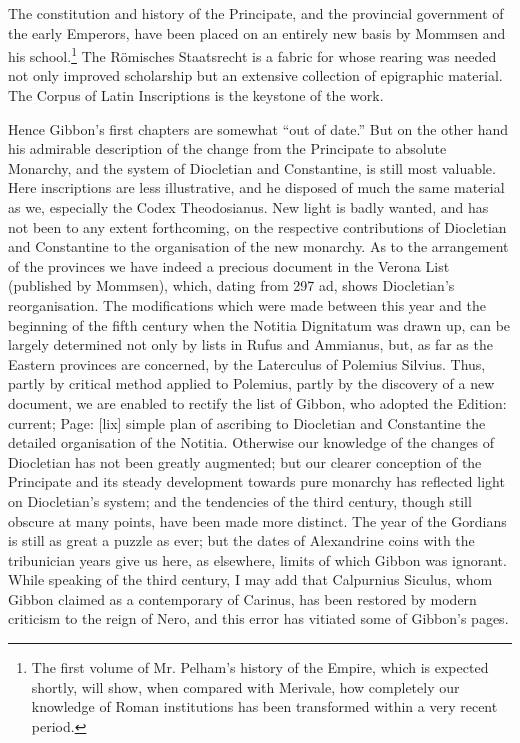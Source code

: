 The constitution and history of the Principate, and the provincial government of the early Emperors, have been placed on an entirely new basis by Mommsen and his school.\footnote{The first volume of Mr. Pelham\texthebrew{}’s history of the Empire, which is expected shortly, will show, when compared with Merivale, how completely our knowledge of Roman institutions has been transformed within a very recent period.} The Römisches Staatsrecht is a fabric for whose rearing was needed not only improved scholarship but an extensive collection of epigraphic material. The Corpus of Latin Inscriptions is the keystone of the work.

Hence Gibbon\texthebrew{}’s first chapters are somewhat \texthebrew{“}out of date.\texthebrew{}” But on the other hand his admirable description of the change from the Principate to absolute Monarchy, and the system of Diocletian and Constantine, is still most valuable. Here inscriptions are less illustrative, and he disposed of much the same material as we, especially the Codex Theodosianus. New light is badly wanted, and has not been to any extent forthcoming, on the respective contributions of Diocletian and Constantine to the organisation of the new monarchy. As to the arrangement of the provinces we have indeed a precious document in the Verona List (published by Mommsen), which, dating from 297 ad, shows Diocletian\texthebrew{}’s reorganisation. The modifications which were made between this year and the beginning of the fifth century when the Notitia Dignitatum was drawn up, can be largely determined not only by lists in Rufus and Ammianus, but, as far as the Eastern provinces are concerned, by the Laterculus of Polemius Silvius. Thus, partly by critical method applied to Polemius, partly by the discovery of a new document, we are enabled to rectify the list of Gibbon, who adopted the Edition: current; Page: [lix] simple plan of ascribing to Diocletian and Constantine the detailed organisation of the Notitia. Otherwise our knowledge of the changes of Diocletian has not been greatly augmented; but our clearer conception of the Principate and its steady development towards pure monarchy has reflected light on Diocletian\texthebrew{}’s system; and the tendencies of the third century, though still obscure at many points, have been made more distinct. The year of the Gordians is still as great a puzzle as ever; but the dates of Alexandrine coins with the tribunician years give us here, as elsewhere, limits of which Gibbon was ignorant. While speaking of the third century, I may add that Calpurnius Siculus, whom Gibbon claimed as a contemporary of Carinus, has been restored by modern criticism to the reign of Nero, and this error has vitiated some of Gibbon\texthebrew{}’s pages.

